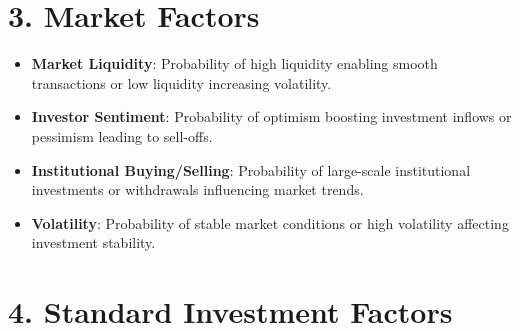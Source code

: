 \documentclass[
]{book}
\providecommand{\tightlist}{%
  \setlength{\itemsep}{0pt}\setlength{\parskip}{0pt}}
\begin{document}
\section{3. Market Factors}\label{market-factors}

\begin{itemize}
\tightlist
\item
  \textbf{Market Liquidity}: Probability of high liquidity enabling smooth transactions or low liquidity increasing volatility.\\
\item
  \textbf{Investor Sentiment}: Probability of optimism boosting investment inflows or pessimism leading to sell-offs.\\
\item
  \textbf{Institutional Buying/Selling}: Probability of large-scale institutional investments or withdrawals influencing market trends.\\
\item
  \textbf{Volatility}: Probability of stable market conditions or high volatility affecting investment stability.
\end{itemize}

\section{4. Standard Investment Factors}\label{standard-investment-factors}
\end{document}
